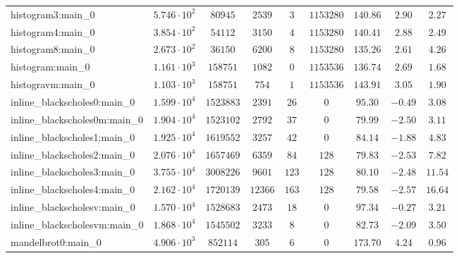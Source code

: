 \begin{tabular}{|l|c|c|c|c|c|c|c|c|}
histogram3:main\_0             & $ 5.746 \cdot 10^{2} $ & $ 80945    $ & $ 2539   $ & $ 3    $ & $ 1153280  $ & $ 140.86      $ & $ 2.90    $ & $ 2.27    $ \\
histogram4:main\_0             & $ 3.854 \cdot 10^{2} $ & $ 54112    $ & $ 3150   $ & $ 4    $ & $ 1153280  $ & $ 140.41      $ & $ 2.88    $ & $ 2.49    $ \\
histogram8:main\_0             & $ 2.673 \cdot 10^{2} $ & $ 36150    $ & $ 6200   $ & $ 8    $ & $ 1153280  $ & $ 135.26      $ & $ 2.61    $ & $ 4.26    $ \\
histogram:main\_0              & $ 1.161 \cdot 10^{3} $ & $ 158751   $ & $ 1082   $ & $ 0    $ & $ 1153536  $ & $ 136.74      $ & $ 2.69    $ & $ 1.68    $ \\
histogravm:main\_0             & $ 1.103 \cdot 10^{3} $ & $ 158751   $ & $ 754    $ & $ 1    $ & $ 1153536  $ & $ 143.91      $ & $ 3.05    $ & $ 1.90    $ \\
inline\_blackscholes0:main\_0  & $ 1.599 \cdot 10^{4} $ & $ 1523883  $ & $ 2391   $ & $ 26   $ & $ 0        $ & $ 95.30       $ & $ -0.49   $ & $ 3.08    $ \\
inline\_blackscholes0m:main\_0 & $ 1.904 \cdot 10^{4} $ & $ 1523102  $ & $ 2792   $ & $ 37   $ & $ 0        $ & $ 79.99       $ & $ -2.50   $ & $ 3.11    $ \\
inline\_blackscholes1:main\_0  & $ 1.925 \cdot 10^{4} $ & $ 1619552  $ & $ 3257   $ & $ 42   $ & $ 0        $ & $ 84.14       $ & $ -1.88   $ & $ 4.83    $ \\
inline\_blackscholes2:main\_0  & $ 2.076 \cdot 10^{4} $ & $ 1657469  $ & $ 6359   $ & $ 84   $ & $ 128      $ & $ 79.83       $ & $ -2.53   $ & $ 7.82    $ \\
inline\_blackscholes3:main\_0  & $ 3.755 \cdot 10^{4} $ & $ 3008226  $ & $ 9601   $ & $ 123  $ & $ 128      $ & $ 80.10       $ & $ -2.48   $ & $ 11.54   $ \\
inline\_blackscholes4:main\_0  & $ 2.162 \cdot 10^{4} $ & $ 1720139  $ & $ 12366  $ & $ 163  $ & $ 128      $ & $ 79.58       $ & $ -2.57   $ & $ 16.64   $ \\
inline\_blackscholesv:main\_0  & $ 1.570 \cdot 10^{4} $ & $ 1528683  $ & $ 2473   $ & $ 18   $ & $ 0        $ & $ 97.34       $ & $ -0.27   $ & $ 3.21    $ \\
inline\_blackscholesvm:main\_0 & $ 1.868 \cdot 10^{4} $ & $ 1545502  $ & $ 3233   $ & $ 8    $ & $ 0        $ & $ 82.73       $ & $ -2.09   $ & $ 3.50    $ \\
mandelbrot0:main\_0            & $ 4.906 \cdot 10^{3} $ & $ 852114   $ & $ 305    $ & $ 6    $ & $ 0        $ & $ 173.70      $ & $ 4.24    $ & $ 0.96    $ \\

\end{tabular}
